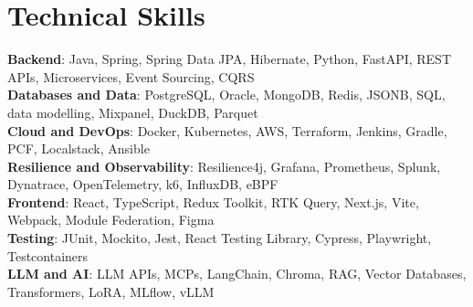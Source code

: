 \documentclass[letterpaper,11pt]{article}
\begin{document}
\section{Technical Skills}
\vspace{-7pt}
\begin{itemize}
[leftmargin=0.15in, label={}]\small{\item{
\textbf{Backend}{: Java, Spring, Spring Data JPA, Hibernate, Python, FastAPI, REST APIs, Microservices, Event Sourcing, CQRS} \\
\textbf{Databases and Data}{: PostgreSQL, Oracle, MongoDB, Redis, JSONB, SQL, data modelling, Mixpanel, DuckDB, Parquet} \\
\textbf{Cloud and DevOps}{: Docker, Kubernetes, AWS, Terraform, Jenkins, Gradle, PCF, Localstack, Ansible} \\
\textbf{Resilience and Observability}{: Resilience4j, Grafana, Prometheus, Splunk, Dynatrace, OpenTelemetry, k6, InfluxDB, eBPF} \\
\textbf{Frontend}{: React, TypeScript, Redux Toolkit, RTK Query, Next.js, Vite, Webpack, Module Federation, Figma} \\
\textbf{Testing}{: JUnit, Mockito, Jest, React Testing Library, Cypress, Playwright, Testcontainers} \\
\textbf{LLM and AI}{: LLM APIs, MCPs, LangChain, Chroma, RAG, Vector Databases, Transformers, LoRA, MLflow, vLLM}
}}
\end{itemize}
\end{document}
